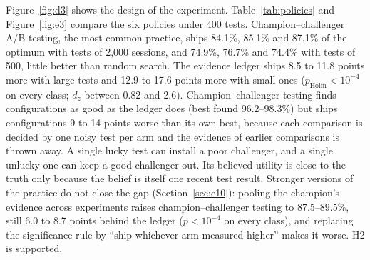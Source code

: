 \documentclass[preprint,12pt,authoryear]{elsarticle}
\theoremstyle{definition}
\begin{document}
Figure~\ref{fig:d3} shows the design of the experiment. Table~\ref{tab:policies} and Figure~\ref{fig:e3} compare the six policies under 400 tests. Champion--challenger A/B testing, the most common practice, ships 84.1\%, 85.1\% and 87.1\% of the optimum with tests of 2,000 sessions, and 74.9\%, 76.7\% and 74.4\% with tests of 500, little better than random search. The evidence ledger ships 8.5 to 11.8 points more with large tests and 12.9 to 17.6 points more with small ones ($p_{\mathrm{Holm}}<10^{-4}$ on every class; $d_z$ between 0.82 and 2.6). Champion--challenger testing finds configurations as good as the ledger does (best found 96.2--98.3\%) but ships configurations 9 to 14 points worse than its own best, because each comparison is decided by one noisy test per arm and the evidence of earlier comparisons is thrown away. A single lucky test can install a poor challenger, and a single unlucky one can keep a good challenger out. Its believed utility is close to the truth only because the belief is itself one recent test result. Stronger versions of the practice do not close the gap (Section~\ref{sec:e10}): pooling the champion's evidence across experiments raises champion--challenger testing to 87.5--89.5\%, still 6.0 to 8.7 points behind the ledger ($p<10^{-4}$ on every class), and replacing the significance rule by ``ship whichever arm measured higher'' makes it worse. H2 is supported.
\end{document}
